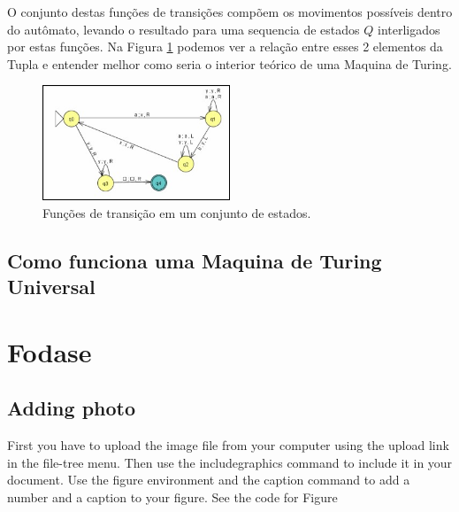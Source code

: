 \documentclass{article}
\begin{document}
    O conjunto destas funções de transições compõem os movimentos possíveis dentro do autômato, levando o resultado para uma sequencia de estados $Q$ interligados por estas funções. Na Figura \ref{fig:funcao_de_transicao} podemos ver a relação entre esses 2 elementos da Tupla e entender melhor como seria o interior teórico de uma Maquina de Turing.
        

\begin{figure}
\centering
\includegraphics[width=0.5\textwidth]{funcao_de_transicao.jpg}
\caption{\label{fig:funcao_de_transicao}Funções de transição em um conjunto de estados.}
\end{figure}



\subsection{Como funciona uma Maquina de Turing Universal}





























\section{Fodase}
\subsection{Adding photo}

First you have to upload the image file from your computer using the upload link in the file-tree menu. Then use the includegraphics command to include it in your document. Use the figure environment and the caption command to add a number and a caption to your figure. See the code for Figure %
\end{document}
